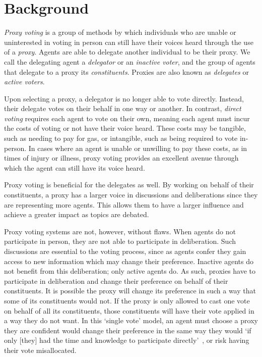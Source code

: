 \section{Background}\label{sec:background}  %
\textit{Proxy voting} is a group of methods by which individuals who are unable or
uninterested in voting in person can still have their voices heard through the use of
a \textit{proxy}.
Agents are able to delegate another individual to be their proxy.
We call the delegating agent a \textit{delegator} or an \textit{inactive voter}, and
the group of agents that delegate to a proxy its \textit{constituents}.
Proxies are also known as \textit{delegates} or \textit{active voters}.

Upon selecting a proxy, a delegator is no longer able to vote directly.
Instead, their delegate votes on their behalf in one way or another.
In contrast, \textit{direct voting} requires each agent to vote on their own, meaning
each agent must incur the costs of voting or not have their voice heard.
These costs may be tangible, such as needing to pay for gas, or intangible, such as
being required to vote in-person.
In cases where an agent is unable or unwilling to pay these costs, as in times of
injury or illness, proxy voting provides an excellent avenue through which the agent
can still have its voice heard.

Proxy voting is beneficial for the delegates as well.
By working on behalf of their constituents, a proxy has a larger voice in discussions
and deliberations since they are representing more agents.
This allows them to have a larger influence and achieve a greater impact as topics
are debated.

Proxy voting systems are not, however, without flaws.
When agents do not participate in person, they are not able to participate in
deliberation.
Such discussions are essential to the voting process, since as agents confer they
gain access to new information which may change their preference.
Inactive agents do not benefit from this deliberation;
only active agents do.
As such, proxies have to participate in deliberation and change their preference on
behalf of their constituents.
It is possible the proxy will change its preference in such a way that some of its
constituents would not.
If the proxy is only allowed to cast one vote on behalf of all its constituents, those
constituents will have their vote applied in a way they do not want.
In this `single vote' model, an agent must choose a proxy they are confident would
change their preference in the same way they would `if only [they] had the time and
knowledge to participate directly'~\cite{Miller1969}, or risk having their vote
misallocated.

